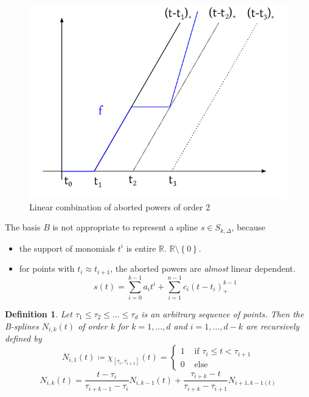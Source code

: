 \documentclass[a4paper]{article}
\newcounter{lecref}[section]
\numberwithin{lecref}{section}
\theoremstyle{break}
\newtheorem{definition}[lecref]{Definition}
\newcommand{\Set}[1]{\left\{#1\right\}}
\begin{document}
\begin{figure}[ht]
  \begin{center}
    \includegraphics{img/splines.pdf}
    \caption{Linear combination of aborted powers of order 2}
    \label{img:splines}
  \end{center}
\end{figure}

The basis $B$ is not appropriate to represent a spline $s \in S_{k,\Delta}$, because
\begin{itemize}
  \item the support of monomials $t^i$ is entire $\mathbb R$. $\mathbb R \setminus \Set{0}$.
  \item for points with $t_i \approx t_{i+1}$, the aborted powers are \emph{almost} linear dependent.
    \[ s(t) = \sum_{i=0}^{k-1} a_i t^i + \sum_{i=1}^{n-1} c_i (t - t_i)_+^{k-1} \]
\end{itemize}

\begin{definition}
  \label{definition:4-21}
  Let $\tau_1 \leq \tau_2 \leq \dots \leq \tau_d$ is an arbitrary sequence of points.
  Then the B-splines $N_{i,k}(t)$ of order $k$ for $k = 1, \dots, d$ and $i = 1, \dots, d-k$
  are recursively defined by
  \[
    N_{i,1}(t) \coloneqq \chi_{[\tau_i,\tau_{i+1}]}(t) = \begin{cases}
      1 & \text{ if } \tau_i \leq t < \tau_{i+1} \\
      0 & \text{ else}
    \end{cases}
  \] \[
    N_{i,k}(t) = \frac{t - \tau_i}{\tau_{i+k-1} - \tau_i} N_{i,k-1}(t) + \frac{\tau_{i+k} - t}{\tau_{i+k} - \tau_{i+1}} N_{i+1,k-1(t)}
  \]
\end{definition}
\end{document}
